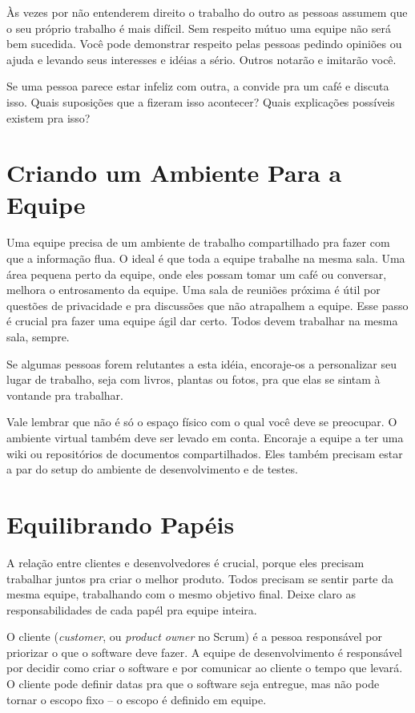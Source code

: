 \documentclass[a4paper, 10pt, font=plain]{abnt}
\begin{document}
Às vezes por não entenderem direito o trabalho do outro as pessoas assumem que o seu próprio trabalho é mais difícil. Sem respeito mútuo uma equipe não será bem sucedida. Você pode demonstrar respeito pelas pessoas pedindo opiniões ou ajuda e levando seus interesses e idéias a sério. Outros notarão e imitarão você.

Se uma pessoa parece estar infeliz com outra, a convide pra um café e discuta isso. Quais suposições que a fizeram isso acontecer? Quais explicações possíveis existem pra isso?


\section{Criando um Ambiente Para a Equipe}
Uma equipe precisa de um ambiente de trabalho compartilhado pra fazer com que a informação flua. O ideal é que toda a equipe trabalhe na mesma sala. Uma área pequena perto da equipe, onde eles possam tomar um café ou conversar, melhora o entrosamento da equipe. Uma sala de reuniões próxima é útil por questões de privacidade e pra discussões que não atrapalhem a equipe. Esse passo é crucial pra fazer uma equipe ágil dar certo. Todos devem trabalhar na mesma sala, sempre.

Se algumas pessoas forem relutantes a esta idéia, encoraje-os a personalizar seu lugar de trabalho, seja com livros, plantas ou fotos, pra que elas se sintam à vontande pra trabalhar.

Vale lembrar que não é só o espaço físico com o qual você deve se preocupar. O ambiente virtual também deve ser levado em conta. Encoraje a equipe a ter uma wiki ou repositórios de documentos compartilhados. Eles também precisam estar a par do setup do ambiente de desenvolvimento e de testes.


\section{Equilibrando Papéis}
A relação entre clientes e desenvolvedores é crucial, porque eles precisam trabalhar juntos pra criar o melhor produto. Todos precisam se sentir parte da mesma equipe, trabalhando com o mesmo objetivo final. Deixe claro as responsabilidades de cada papél pra equipe inteira.

O cliente (\textit{customer}, ou \textit{product owner} no Scrum) é a pessoa responsável por priorizar o que o software deve fazer. A equipe de desenvolvimento é responsável por decidir como criar o software e por comunicar ao cliente o tempo que levará. O cliente pode definir datas pra que o software seja entregue, mas não pode tornar o escopo fixo -- o escopo é definido em equipe.
\end{document}
